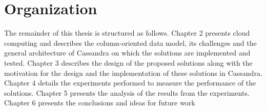 \section{Organization} 

The remainder of this thesis is structured as follows.  Chapter \textmd{2} 
presents cloud computing and describes the column-oriented data model,  its
challenges and the general architecture of Cassandra on which the solutions are
implemented and tested. 
Chapter 3 describes the design of the proposed solutions along with the
motivation for the design and the implementation of these solutions in
Cassandra.  Chapter 4 details the experiments performed to measure the
performance of the solutions.  Chapter 5 presents the analysis of the results
from the experiments.  Chapter 6  presents the conclusions and ideas for future
work
